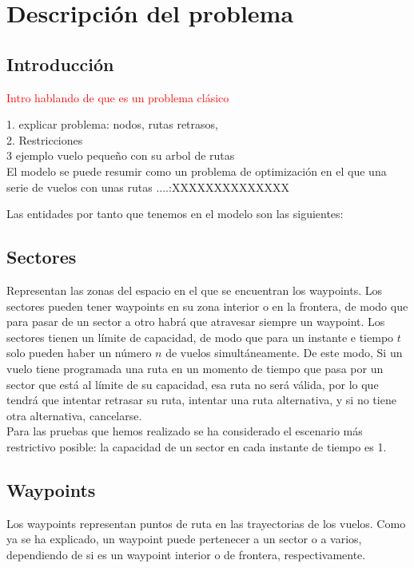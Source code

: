 \chapter{Descripción del problema}
\section{Introducción}
\textcolor{red}{Intro hablando de que es un problema clásico}

1. explicar problema: nodos, rutas retrasos,		\\
2. Restricciones\\
3 ejemplo vuelo pequeño con su arbol de rutas\\

El modelo se puede resumir como un problema de optimización en el que una serie de vuelos con unas rutas ....:XXXXXXXXXXXXXX


Las entidades por tanto que tenemos en el modelo son las siguientes:
\section{Sectores}
Representan las zonas del espacio en el que se encuentran los waypoints. Los sectores pueden tener waypoints en su zona interior o en la frontera, de modo que para pasar de un sector a otro habrá que atravesar siempre un waypoint. Los sectores tienen un límite de capacidad, de modo que para un instante e tiempo $t$ solo pueden haber un número $n$ de vuelos simultáneamente. De este modo, Si un vuelo tiene programada una ruta en un momento de tiempo que pasa por un sector que está al límite de su capacidad, esa ruta no será válida, por lo que tendrá que intentar retrasar su ruta, intentar una ruta alternativa, y si no tiene otra alternativa, cancelarse.\\
Para las pruebas que hemos realizado se ha considerado el escenario más restrictivo posible: la capacidad de un sector en cada instante de tiempo es 1.
\section{Waypoints}
Los waypoints representan puntos de ruta en las trayectorias de los vuelos. Como ya se ha explicado, un waypoint puede pertenecer a un sector o a varios, dependiendo de si es un waypoint interior o de frontera, respectivamente.

